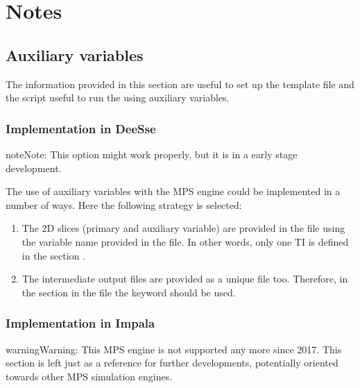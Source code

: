 \documentclass[letterpaper,10pt,english]{sphinxmanual}
\begin{document}
\chapter{Notes}
\label{\detokenize{notes:notes}}\label{\detokenize{notes::doc}}

\section{Auxiliary variables}
\label{\detokenize{notes:auxiliary-variables}}
The information provided in this section are useful to set up the
template file and the  script useful to run the 
using auxiliary variables.


\subsection{Implementation in DeeSse}
\label{\detokenize{notes:implementation-in-deesse}}
\begin{sphinxadmonition}{note}{Note:}
This option might work properly, but it is in a early stage
development.
\end{sphinxadmonition}

The use of auxiliary variables with the 
MPS engine could be implemented in a number of ways. Here the
following strategy is selected:
\begin{enumerate}
%
\item {} 
The 2D slices (primary and auxiliary variable) are provided in the
  file using the variable name provided in the
file. In other words, only one TI is defined in the section .

\item {} 
The intermediate output files are provided as a unique file
too. Therefore, in the section 
in the  file the keyword
 should be used.

\end{enumerate}


\subsection{Implementation in Impala}
\label{\detokenize{notes:implementation-in-impala}}
\begin{sphinxadmonition}{warning}{Warning:}
This MPS engine is not supported any more
since 2017. This section is left just as a reference for
further developments, potentially oriented towards other
MPS simulation engines.
\end{sphinxadmonition}
\end{document}
